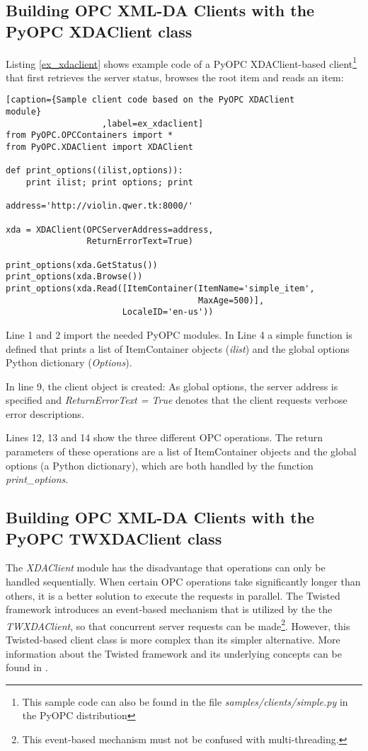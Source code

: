 \subsection{Building OPC XML-DA Clients with the PyOPC XDAClient class}

Listing \ref{ex_xdaclient} shows example code of a PyOPC
XDAClient-based client\footnote{This sample code can also be found in
the file {\sl samples/clients/simple.py} in the PyOPC distribution}
that first retrieves the server status, browses the root item and
reads an item:


\lstset{language=C}
\begin{lstlisting}[caption={Sample client code based on the PyOPC XDAClient 
module}
                   ,label=ex_xdaclient] 
from PyOPC.OPCContainers import *
from PyOPC.XDAClient import XDAClient

def print_options((ilist,options)):
    print ilist; print options; print
    
address='http://violin.qwer.tk:8000/'

xda = XDAClient(OPCServerAddress=address,
                ReturnErrorText=True)

print_options(xda.GetStatus())
print_options(xda.Browse())
print_options(xda.Read([ItemContainer(ItemName='simple_item', 
                                      MaxAge=500)], 
                       LocaleID='en-us'))
\end{lstlisting}

Line 1 and 2 import the needed PyOPC modules. In Line 4 a simple function
is defined that prints a list of ItemContainer objects ({\sl ilist}) and
the global options Python dictionary ({\sl Options}).

In line 9, the client object is created: As global options, the server
address is specified and {\sl ReturnErrorText = True} denotes that the
client requests verbose error descriptions.

Lines 12, 13 and 14 show the three different OPC operations. The
return parameters of these operations are a list of ItemContainer
objects and the global options (a Python dictionary), which are both
handled by the function {\sl print\_options}.

\subsection{Building OPC XML-DA Clients with the PyOPC TWXDAClient class}

The {\sl XDAClient} module has the disadvantage that operations can
only be handled sequentially. When certain OPC operations take
significantly longer than others, it is a better solution to execute
the requests in parallel. The Twisted framework introduces an
event-based mechanism that is utilized by the the {\sl TWXDAClient},
so that concurrent server requests can be made\footnote{This
event-based mechanism must not be confused with
multi-threading.}. However, this Twisted-based client class is more
complex than its simpler alternative. More information about the
Twisted framework and its underlying concepts can be found in
\cite{TWISTED}.

